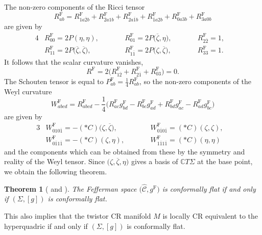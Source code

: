 \documentclass[pdftex]{sigma}
\newcommand\ol{\overline}
\newcommand{\wh}{\widehat}
\numberwithin{equation}{section}
\newtheorem{Theorem}{Theorem}[section]
\begin{document}
The non-zero components of the Ricci tensor
\[
R^{\mathrm{F}}_{ab}=R^{\mathrm{F}}_{1a\ol2b}+R^{\mathrm{F}}_{\ol2a1b}+R^{\mathrm{F}}_{2a\ol1b}+R^{\mathrm{F}}_{\ol1a2b}+R^{\mathrm{F}}_{0a3b}+R^{\mathrm{F}}_{3a0b}
\]
are given by
\begin{alignat*}{4}
&R^{\mathrm{F}}_{00}=2P(\eta, \eta), \qquad&&
R^{\mathrm{F}}_{01}=2P\bigl(\ol\zeta, \eta\bigr), \qquad&&
R^{\mathrm{F}}_{2\ol2}=1,& \\
&R^{\mathrm{F}}_{11}=2P\bigl(\ol\zeta, \ol\zeta\bigr),\qquad&&
R^{\mathrm{F}}_{1\ol1}=2P\bigl(\zeta, \ol\zeta\bigr),\qquad&&
R^{\mathrm{F}}_{33}=1.&
\end{alignat*}
It follows that the scalar curvature vanishes,
\[
R^{\mathrm{F}}=2\bigl(R^{\mathrm{F}}_{1\ol2}+R^{\mathrm{F}}_{2\ol1}+R^{\mathrm{F}}_{03}\bigr)=0.
\]
The Schouten tensor is equal to $P^{\mathrm{F}}_{ab}=\frac{1}{4}R^{\mathrm{F}}_{ab}$, so the non-zero components of the Weyl curvature
\[
W^{\mathrm{F}}_{abcd}=R^{\mathrm{F}}_{abcd}-\frac{1}{4}
\bigl(R^{\mathrm{F}}_{ac}g^{\mathrm{F}}_{bd}-R^{\mathrm{F}}_{bc}g^{\mathrm{F}}_{ad}+R^{\mathrm{F}}_{bd}g^{\mathrm{F}}_{ac}-R^{\mathrm{F}}_{ad}g^{\mathrm{F}}_{bc}\bigr)
\]
are given by
\begin{alignat*}{3}
&W^{\mathrm{F}}_{010\ol1}=-(*C)\bigl(\zeta, \ol\zeta\bigr),\qquad&&
W^{\mathrm{F}}_{0\ol10\ol1}=(*C)(\zeta, \zeta),& \\
&W^{\mathrm{F}}_{0\ol11\ol1}=-(*C)(\zeta, \eta),\qquad&&
W^{\mathrm{F}}_{1\ol11\ol1}=(*C)(\eta, \eta)&
\end{alignat*}
and the components which can be obtained from these by the symmetry and reality of the Weyl tensor.
Since $\bigl(\zeta, \ol\zeta, \eta\bigr)$ gives a basis of $\mathbb{C}T\Sigma$ at the base point, we obtain the following theorem.

\begin{Theorem}[{\cite[Theorem 6.7]{Low}} and \cite{SY}]\label{flat}
The Fefferman space $\bigl(\wh{\mathcal{C}}, g^{\mathrm{F}}\bigr)$ is conformally flat if and only if $(\Sigma, [g])$ is conformally flat.
\end{Theorem}

This also implies that the twistor CR manifold $M$ is locally CR equivalent to the hyperquadric if and only if $(\Sigma, [g])$ is conformally flat.
\end{document}
